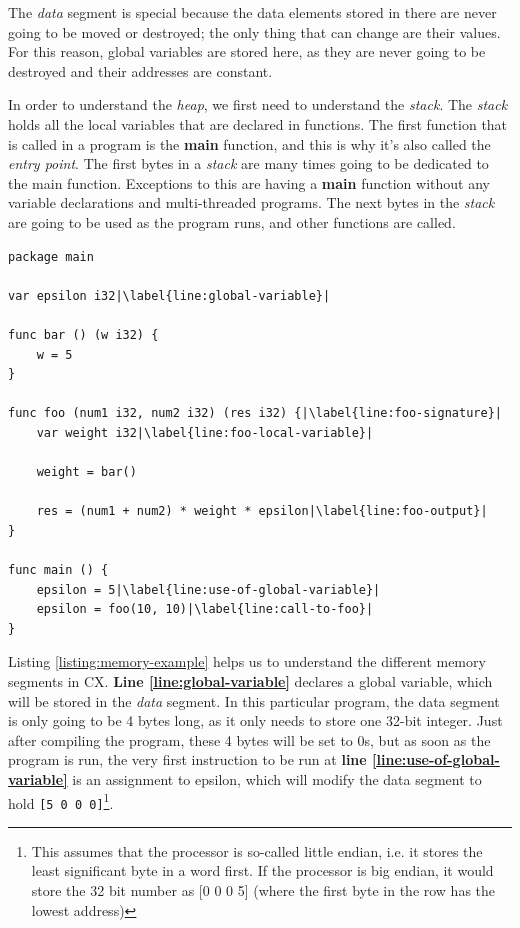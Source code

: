 \documentclass[11pt,fleqn,openany]{book} %
\begin{document}
The \emph{data} segment is special because the data elements stored in there are never going to be moved or destroyed; the only thing that can change are their values. For this reason, global variables are stored here, as they are never going to be destroyed and their addresses are constant.

In order to understand the \emph{heap}, we first need to understand the \emph{stack}. The \emph{stack} holds all the local variables that are declared in functions. The first function that is called in a program is the \textbf{main} function, and this is why it's also called the \emph{entry point}. The first bytes in a \emph{stack} are many times going to be dedicated to the main function. Exceptions to this are having a \textbf{main} function without any variable declarations and multi-threaded programs. The next bytes in the \emph{stack} are going to be used as the program runs, and other functions are called.

\begin{lstlisting}[caption={The use of different memory segments},captionpos=b,label={listing:memory-example}]
package main

var epsilon i32|\label{line:global-variable}|

func bar () (w i32) {
	w = 5
}

func foo (num1 i32, num2 i32) (res i32) {|\label{line:foo-signature}|
	var weight i32|\label{line:foo-local-variable}|

	weight = bar()

	res = (num1 + num2) * weight * epsilon|\label{line:foo-output}|
}

func main () {
	epsilon = 5|\label{line:use-of-global-variable}|
	epsilon = foo(10, 10)|\label{line:call-to-foo}|
}

\end{lstlisting}

Listing \ref{listing:memory-example} helps us to understand the different memory segments in CX. \textbf{Line \ref{line:global-variable}} declares a global variable, which will be stored in the \emph{data} segment. In this particular program, the data segment is only going to be 4 bytes long, as it only needs to store one 32-bit integer. Just after compiling the program, these 4 bytes will be set to 0s, but as soon as the program is run, the very first instruction to be run at \textbf{line \ref{line:use-of-global-variable}} is an assignment to epsilon, which will modify the data segment to hold \lstinline{[5 0 0 0]}\footnote{This assumes that the processor is so-called little endian, i.e. it stores the least significant byte in a word first.  If the processor is big endian, it would store the 32 bit number as [0 0 0 5] (where the first byte in the row has the lowest address)}.
\end{document}
